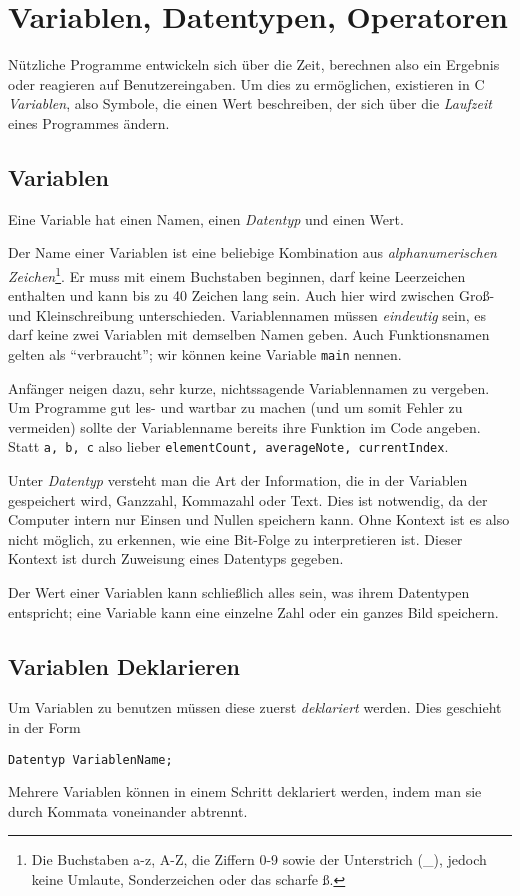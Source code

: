 \section{Variablen, Datentypen, Operatoren} \label{sec:expressions}
Nützliche Programme entwickeln sich über die Zeit, berechnen also \eg ein Ergebnis oder reagieren auf Benutzereingaben. Um dies zu ermöglichen, existieren in C \emph{Variablen}, also Symbole, die einen Wert beschreiben, der sich über die \emph{Laufzeit} eines Programmes ändern.

\subsection{Variablen}
Eine Variable hat einen Namen, einen \emph{Datentyp} und einen Wert.

Der Name einer Variablen ist eine beliebige Kombination aus \emph{alphanumerischen Zeichen}\footnote{Die Buchstaben a-z, A-Z, die Ziffern 0-9 sowie der Unterstrich (\_), jedoch keine Umlaute, Sonderzeichen oder das scharfe ß.}. Er muss mit einem Buchstaben beginnen, darf keine Leerzeichen enthalten und kann bis zu 40 Zeichen lang sein. Auch hier wird zwischen Groß- und Kleinschreibung unterschieden. Variablennamen müssen \emph{eindeutig} sein, \ie es darf keine zwei Variablen mit demselben Namen geben. Auch Funktionsnamen gelten als \enquote{verbraucht}; wir können keine Variable \texttt{main} nennen.

Anfänger neigen dazu, sehr kurze, nichtssagende Variablennamen zu vergeben. Um Programme gut les- und wartbar zu machen (und um somit Fehler zu vermeiden) sollte der Variablenname bereits ihre Funktion im Code angeben. Statt \texttt{a, b, c} also lieber \texttt{elementCount, averageNote, currentIndex}.

Unter \emph{Datentyp} versteht man die Art der Information, die in der Variablen gespeichert wird, \eg Ganzzahl, Kommazahl oder Text. Dies ist notwendig, da der Computer intern nur Einsen und Nullen speichern kann. Ohne Kontext ist es also nicht möglich, zu erkennen, wie eine Bit-Folge zu interpretieren ist. Dieser Kontext ist durch Zuweisung eines Datentyps gegeben.

Der Wert einer Variablen kann schließlich alles sein, was ihrem Datentypen entspricht; eine Variable kann \eg eine einzelne Zahl oder ein ganzes Bild speichern.

\subsection{Variablen Deklarieren} \label{sec:DeclareVars}
Um Variablen zu benutzen müssen diese zuerst \emph{deklariert} werden. Dies geschieht in der Form
\begin{codebox}
\texttt{Datentyp VariablenName;}
\end{codebox}
Mehrere Variablen können in einem Schritt deklariert werden, indem man sie durch Kommata voneinander abtrennt.

